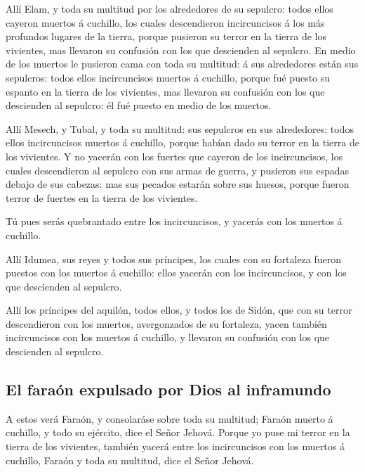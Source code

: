  Allí Elam, y toda su multitud por los alrededores de su
sepulcro: todos ellos cayeron muertos á cuchillo, los cuales
descendieron incircuncisos á los más profundos lugares de la tierra,
porque pusieron su terror en la tierra de los vivientes, mas llevaron su
confusión con los que descienden al sepulcro.  En medio
de los muertos le pusieron cama con toda su multitud: á sus alrededores
están sus sepulcros: todos ellos incircuncisos muertos á cuchillo,
porque fué puesto su espanto en la tierra de los vivientes, mas llevaron
su confusión con los que descienden al sepulcro: él fué puesto en medio
de los muertos.

 Allí Mesech, y Tubal, y toda su multitud: sus sepulcros
en sus alrededores: todos ellos incircuncisos muertos á cuchillo, porque
habían dado su terror en la tierra de los vivientes.  Y
no yacerán con los fuertes que cayeron de los incircuncisos, los cuales
descendieron al sepulcro con sus armas de guerra, y pusieron sus espadas
debajo de sus cabezas: mas sus pecados estarán sobre sus huesos, porque
fueron terror de fuertes en la tierra de los vivientes.

 Tú pues serás quebrantado entre los incircuncisos, y
yacerás con los muertos á cuchillo.

 Allí Idumea, sus reyes y todos sus príncipes, los cuales
con su fortaleza fueron puestos con los muertos á cuchillo: ellos
yacerán con los incircuncisos, y con los que descienden al sepulcro.

 Allí los príncipes del aquilón, todos ellos, y todos los
de Sidón, que con su terror descendieron con los muertos, avergonzados
de su fortaleza, yacen también incircuncisos con los muertos á cuchillo,
y llevaron su confusión con los que descienden al sepulcro.

\hypertarget{el-farauxf3n-expulsado-por-dios-al-inframundo}{%
\subsection{El faraón expulsado por Dios al
inframundo}\label{el-farauxf3n-expulsado-por-dios-al-inframundo}}

 A estos verá Faraón, y consolaráse sobre toda su
multitud; Faraón muerto á cuchillo, y todo su ejército, dice el Señor
Jehová.  Porque yo puse mi terror en la tierra de los
vivientes, también yacerá entre los incircuncisos con los muertos á
cuchillo, Faraón y toda su multitud, dice el Señor Jehová.

